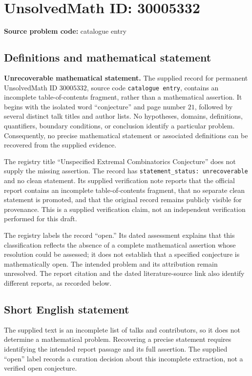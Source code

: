 \documentclass[11pt]{article}
\begin{document}
\section*{UnsolvedMath ID: 30005332}
\textbf{Source problem code:} catalogue entry
\subsection{Definitions and mathematical statement}
\textbf{Unrecoverable mathematical statement.} The supplied record for permanent UnsolvedMath ID \(30005332\), source code \texttt{catalogue entry}, contains an incomplete table-of-contents fragment, rather than a mathematical assertion. It begins with the isolated word ``conjecture'' and page number \(21\), followed by several distinct talk titles and author lists. No hypotheses, domains, definitions, quantifiers, boundary conditions, or conclusion identify a particular problem. Consequently, no precise mathematical statement or associated definitions can be recovered from the supplied evidence.

The registry title ``Unspecified Extremal Combinatorics Conjecture'' does not supply the missing assertion. The record has \texttt{statement\_status: unrecoverable} and no clean statement. Its supplied verification note reports that the official report contains an incomplete table-of-contents fragment, that no separate clean statement is promoted, and that the original record remains publicly visible for provenance. This is a supplied verification claim, not an independent verification performed for this draft.

The registry labels the record ``open.'' Its dated assessment explains that this classification reflects the absence of a complete mathematical assertion whose resolution could be assessed; it does not establish that a specified conjecture is mathematically open. The intended problem and its attribution remain unresolved. The report citation and the dated literature-source link also identify different reports, as recorded below.
\subsection{Short English statement}
The supplied text is an incomplete list of talks and contributors, so it does not determine a mathematical problem. Recovering a precise statement requires identifying the intended report passage and its full assertion. The supplied ``open'' label records a curation decision about this incomplete extraction, not a verified open conjecture.
\end{document}
